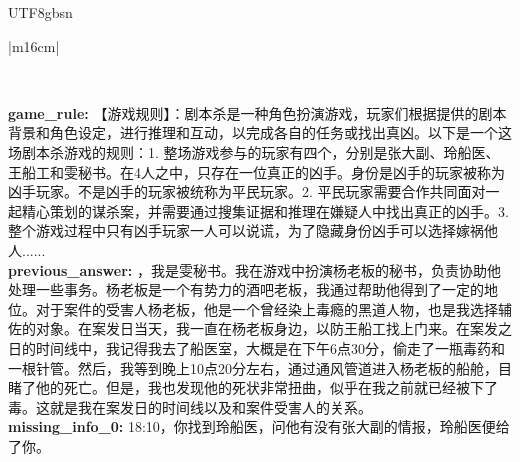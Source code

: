 \documentclass[11pt]{article}
\begin{document}
{\begin{CJK}{UTF8}{gbsn}
\begin{table}[ht!]
\begin{minipage}{\textwidth}
\begin{tabular}{|m{16cm}|}
\begin{minipage}[t]{\linewidth}
\begin{verbatim}
\end{verbatim}
\end{minipage} \\
 \textbf{   game\_rule:} \small【游戏规则】：剧本杀是一种角色扮演游戏，玩家们根据提供的剧本背景和角色设定，进行推理和互动，以完成各自的任务或找出真凶。以下是一个这场剧本杀游戏的规则：1. 整场游戏参与的玩家有四个，分别是张大副、玲船医、王船工和雯秘书。在4人之中，只存在一位真正的凶手。身份是凶手的玩家被称为凶手玩家。不是凶手的玩家被统称为平民玩家。2. 平民玩家需要合作共同面对一起精心策划的谋杀案，并需要通过搜集证据和推理在嫌疑人中找出真正的凶手。3. 整个游戏过程中只有凶手玩家一人可以说谎，为了隐藏身份凶手可以选择嫁祸他人......\\
 \textbf{   previous\_answer:} ，我是雯秘书。我在游戏中扮演杨老板的秘书，负责协助他处理一些事务。杨老板是一个有势力的酒吧老板，我通过帮助他得到了一定的地位。对于案件的受害人杨老板，他是一个曾经染上毒瘾的黑道人物，也是我选择辅佐的对象。在案发日当天，我一直在杨老板身边，以防王船工找上门来。在案发之日的时间线中，我记得我去了船医室，大概是在下午6点30分，偷走了一瓶毒药和一根针管。然后，我等到晚上10点20分左右，通过通风管道进入杨老板的船舱，目睹了他的死亡。但是，我也发现他的死状非常扭曲，似乎在我之前就已经被下了毒。这就是我在案发日的时间线以及和案件受害人的关系。\\
  \textbf{   missing\_info\_0:} \small18:10，你找到玲船医，问他有没有张大副的情报，玲船医便给了你。\\


\end{tabular}
\end{minipage}
\end{table}
\end{CJK}}
\end{document}
